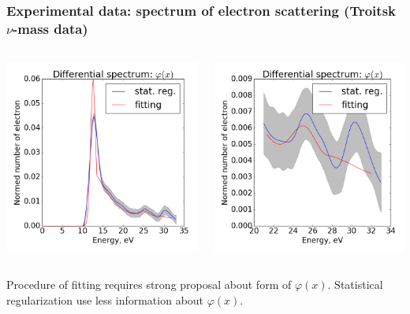 \documentclass[8pt,pdf,hyperref={unicode}]{beamer}
\begin{document}
\begin{frame}    
    \frametitle{Experimental data: spectrum of electron scattering (Troitsk $\nu$-mass data)}
    \begin{columns}
        \begin{column}{0.5\textwidth}
            \includegraphics[width=\textwidth]{image/fig07.png}
        \end{column}
        \begin{column}{0.5\textwidth}
            \includegraphics[width=\textwidth]{image/fig09.png}
        \end{column}
    \end{columns}
{\LARGE     Procedure of fitting requires strong proposal about form of $\varphi(x)$.
    Statistical regularization use less information about  $\varphi(x)$.}
\end{frame}
\end{document}
